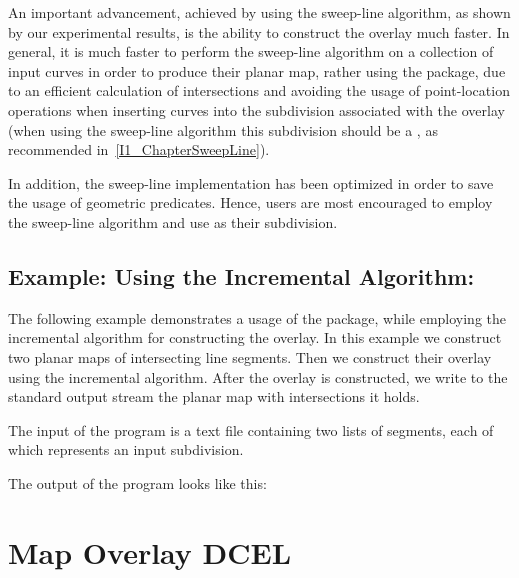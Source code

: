 \begin{ccTexOnly}
An important advancement, achieved by using the sweep-line algorithm, 
as shown by our experimental results,
is the ability to construct the overlay much faster.
In general, it is much faster to perform the sweep-line algorithm on
a collection of input curves in order to produce their planar map,
rather using the  package,
due to an efficient calculation of intersections and avoiding the usage of
point-location operations when inserting curves into the subdivision 
associated with the overlay (when using the sweep-line algorithm this 
subdivision should be a , 
as recommended in~\ref{I1_ChapterSweepLine}).

In addition, the sweep-line implementation has been optimized in order to
save the usage of geometric predicates. 
Hence, users are most encouraged to employ the sweep-line algorithm 
and use  as their subdivision. 

\subsection*{Example: Using the Incremental Algorithm:}
The following example demonstrates a usage of the 
 package, 
while employing the incremental algorithm for constructing the overlay.
In this example we construct two planar maps of intersecting line segments. 
Then we construct their overlay using the incremental algorithm. 
After the overlay is constructed, we write to the standard output stream 
the planar map with intersections it holds. 

The input of the program is a text file containing two lists of segments, 
each of which represents an input subdivision.

The output of the program looks like this:

\section{Map Overlay DCEL}
\label{sec:dcel}


\end{ccTexOnly}

